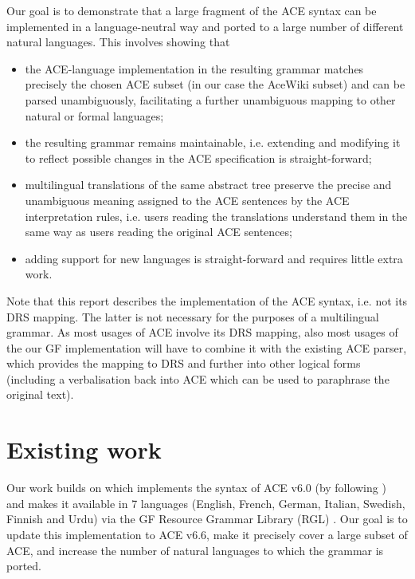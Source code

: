 \documentclass[a4paper]{article}
\begin{document}
Our goal is to demonstrate that a large fragment of the ACE syntax
can be implemented in a language-neutral way and ported to a large number
of different natural languages.
This involves showing that

\begin{itemize}
\item the ACE-language implementation in the resulting grammar matches
precisely the chosen ACE subset (in our case the AceWiki subset)
and can be parsed unambiguously, facilitating a further unambiguous mapping
to other natural or formal languages;
\item the resulting grammar remains maintainable, i.e. extending and modifying
it to reflect possible changes in the ACE specification is straight-forward;
\item multilingual translations of the same abstract tree preserve the precise
and unambiguous meaning assigned to the ACE sentences by the ACE interpretation
rules, i.e. users reading the translations understand them in the same way
as users reading the original ACE sentences;
\item adding support for new languages is straight-forward and requires little
extra work.
\end{itemize}

Note that this report describes the implementation of the ACE syntax,
i.e. not its DRS mapping. The latter is not necessary for the purposes of a
multilingual grammar. As most usages of ACE involve its DRS mapping, also
most usages of the our GF implementation
will have to combine it with the existing ACE parser, which provides the
mapping to DRS and further into other logical forms (including a verbalisation
back into ACE which can be used to paraphrase the original text).


\section{Existing work}
\label{section:Existing_work}

Our work builds on \cite{ranta:cnl2009_revised} which implements the syntax
of ACE v6.0 (by following \cite{ACE_6.0_Construction_Rules}) and makes it
available in 7 languages (English, French, German, Italian, Swedish, Finnish
and Urdu) via the GF Resource Grammar Library (RGL) \cite{ranta:lilt2009}.
Our goal is to update this implementation to ACE v6.6, make it precisely
cover a large subset of ACE, and increase the number of natural languages to
which the grammar is ported.
\end{document}
